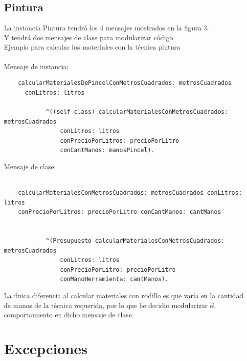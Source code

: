 \documentclass[titlepage,a4paper]{article}
\begin{document}
\subsection{Pintura}
    La instancia Pintura tendrá los 4 mensajes mostrados en la figura 3.\\
    Y tendrá dos mensajes de clase para modularizar código.\\
    Ejemplo para calcular los materiales con la técnica pintura\\\\
    Mensaje de instancia:
    \begin{verbatim}
    calcularMaterialesDePincelConMetrosCuadrados: metrosCuadrados
      conLitros: litros
    
	        ^((self class) calcularMaterialesConMetrosCuadrados: metrosCuadrados 
	            conLitros: litros
	            conPrecioPorLitros: precioPorLitro 
	            conCantManos: manosPincel).
    \end{verbatim}
    Mensaje de clase:
    \begin{verbatim}
    
    calcularMaterialesConMetrosCuadrados: metrosCuadrados conLitros: litros
    conPrecioPorLitros: precioPorLitro conCantManos: cantManos


            ^(Presupuesto calcularMaterialesConMetrosCuadrados: metrosCuadrados
    	        conLitros: litros
    	        conPrecioPorLitro: precioPorLitro
    	        conManoHerramienta: cantManos).
    \end{verbatim}
    La única diferencia al calcular materiales con rodillo es que varía en la cantidad de manos de la técnica requerida, por lo que he decidio modularizar el comportamiento en dicho mensaje de clase.
    
\section{Excepciones}\label{sec:excepciones}
\end{document}
